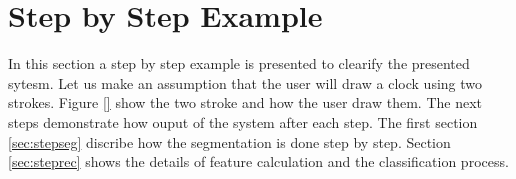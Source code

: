 %
 



\section{Step by Step Example}
\label{secstepExample}
In this section a step by step example is presented to clearify the presented sytesm. Let us make an assumption that the user will draw a clock using two strokes. Figure \ref{} show the two stroke and how the user draw them. The next steps demonstrate how ouput of the system after each step. The first section \ref{sec:stepseg} discribe how the segmentation is done step by step. Section \ref{sec:steprec} shows the details of feature calculation and the classification process. 


